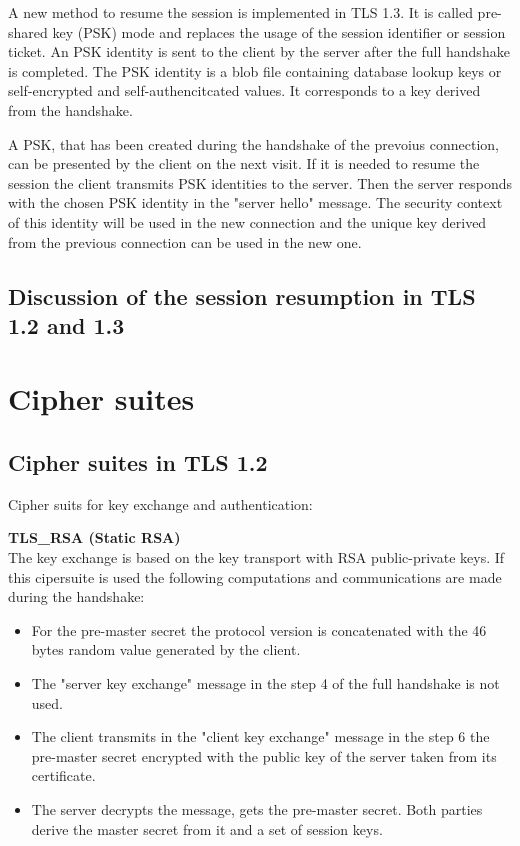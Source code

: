 A new method to resume the session is implemented in TLS 1.3. It is called pre-shared key (PSK) mode and replaces the usage of the session identifier or session ticket. An PSK identity is sent to the client by the server after the full handshake is completed. The PSK identity is a blob file containing database lookup keys or self-encrypted and self-authencitcated values. It corresponds to a key derived from the handshake.

A PSK, that has been created during the handshake of the prevoius connection, can be presented by the client on the next visit. If it is needed to resume the session the client transmits PSK identities to the server. Then the server responds with the chosen PSK identity in the "server hello" message. The security context of this identity will be used in the new connection and the unique key derived from the previous connection can be used in the new one. \cite{ldapwiki:resumption}

\subsection{Discussion of the session resumption in TLS 1.2 and 1.3}
\label{subsec:discussion_resumption}

\section{Cipher suites}
\label{sec:comparison_ciphersuits}

\subsection{Cipher suites in TLS 1.2}
\label{subsec:ciphersuits1_2}

Cipher suits for key exchange and authentication:

\textbf{TLS\_RSA (Static RSA)} \\
The key exchange is based on the key transport with RSA public-private keys.
If this cipersuite is used the following computations and communications are made during the handshake:
\begin{itemize}
	\item For the pre-master secret the protocol version is concatenated with the 46 bytes random value generated by the client.
	\item The "server key exchange" message in the step 4 of the full handshake is not used.
	\item The client transmits in the "client key exchange" message in the step 6 the pre-master secret encrypted with the public key of the server taken from its certificate.
	\item The server decrypts the message, gets the pre-master secret. Both parties derive the master secret from it and a set of session keys.
\end{itemize}

